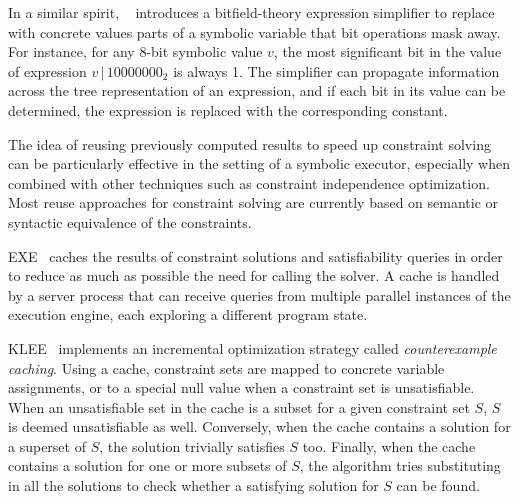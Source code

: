 In a similar spirit, {\sc \stwoe}~\cite{CKC-TOCS12} introduces a bitfield-theory expression simplifier to replace with concrete values parts of a symbolic variable that bit operations mask away. For instance, for any 8-bit symbolic value $v$, the most significant bit in the value of expression $v\,|\,10000000_2$ is always 1. The simplifier can propagate information across the tree representation of an expression, and if each bit in its value can be determined, the expression is replaced with the corresponding constant.
 



The idea of reusing previously computed results to speed up constraint solving can be particularly effective in the setting of a symbolic executor, especially when combined with other techniques such as constraint independence optimization. Most reuse approaches for constraint solving are currently based on semantic or syntactic equivalence of the constraints.

{\sc EXE}~\cite{EXE-CCS06} caches the results of constraint solutions and satisfiability queries in order to reduce as much as possible the need for calling the solver. A cache is handled by a server process that can receive queries from multiple parallel instances of the execution engine, each exploring a different program state.

{\sc KLEE}~\cite{KLEE-OSDI08} implements an incremental optimization strategy called {\em counterexample caching}. Using a cache, constraint sets are mapped to concrete variable assignments, or to a special null value when a constraint set is unsatisfiable. When an unsatisfiable set in the cache is a subset for a given constraint set $S$, $S$ is deemed unsatisfiable as well. Conversely, when the cache contains a solution for a superset of $S$, the solution trivially satisfies $S$ too. Finally, when the cache contains a solution for one or more subsets of $S$, the algorithm tries substituting in all the solutions to check whether a satisfying solution for $S$ can be found.

